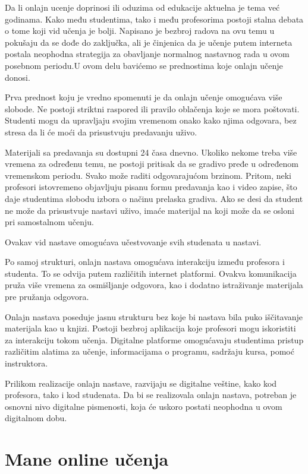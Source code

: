 \documentclass{article}
\begin{document}
Da li onlajn ucenje doprinosi ili oduzima od edukacije aktuelna je tema već godinama. Kako među studentima, tako i među profesorima postoji stalna debata o tome koji vid učenja je bolji. Napisano je bezbroj radova na ovu temu u pokušaju da se dođe do zaključka, ali je činjenica da je učenje putem interneta postala neophodna strategija za obavljanje normalnog nastavnog rada u ovom posebnom periodu.U ovom delu bavićemo se prednostima koje onlajn učenje donosi.

Prva prednost koju je vredno spomenuti je da onlajn učenje omogućava više slobode. Ne postoji striktni raspored ili pravilo oblačenja koje se mora poštovati. Studenti mogu da upravljaju svojim vremenom onako kako njima odgovara, bez stresa da li će moći da prisustvuju predavanju uživo.

Materijali sa predavanja su dostupni 24 časa dnevno. Ukoliko nekome treba više vremena za određenu temu, ne postoji pritisak da se gradivo pređe u određenom vremenskom periodu. Svako može raditi odgovarajućom brzinom. Pritom, neki profesori istovremeno objavljuju pisanu formu predavanja kao i video zapise, što daje studentima slobodu izbora o načinu prelaska gradiva. Ako se desi da student ne može da prisustvuje nastavi uživo, imaće materijal na koji može da se osloni pri samostalnom učenju.

Ovakav vid nastave omogućava učestvovanje svih studenata u nastavi.

Po samoj strukturi, onlajn nastava omogućava interakciju između profesora i studenta. To se odvija putem različitih internet platformi. Ovakva komunikacija pruža više vremena za osmišljanje odgovora, kao i dodatno istraživanje materijala pre pružanja odgovora.

Onlajn nastava poseduje jasnu strukturu bez koje bi nastava bila puko iščitavanje materijala kao u knjizi. Postoji bezbroj aplikacija koje profesori mogu iskoristiti za interakciju tokom učenja. Digitalne platforme omogućavaju studentima pristup različitim alatima za učenje, informacijama o programu, sadržaju kursa, pomoć instruktora.

Prilikom realizacije onlajn nastave, razvijaju se digitalne veštine, kako kod profesora, tako i kod studenata. Da bi se realizovala onlajn nastava, potreban je osnovni nivo digitalne pismenosti, koja će uskoro postati neophodna u ovom digitalnom dobu.
\cite{2}


\section{Mane online učenja}
\end{document}
